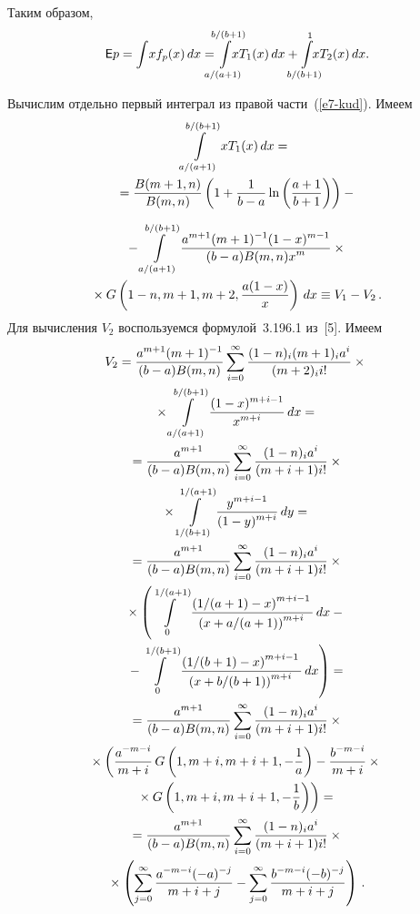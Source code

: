 \begin{multicols}{2}
Таким образом,
\begin{equation}
 {\sf E} p = \int\! xf_p(x)\,dx=\hspace*{-3mm}\il{a/(a+1)}{b/(b+1)}\hspace*{-4mm}
 xT_{1}(x)\, dx + \hspace*{-3mm}\il{b/(b+1)}{1} \hspace*{-4mm}xT_{2}(x)\, dx.\!\label{e7-kud}
 \end{equation}

Вычислим отдельно первый интеграл из правой части~(\ref{e7-kud}). Имеем
\begin{multline*}
\il{a/(a+1)}{b/(b+1)} xT_{1}(x) \,dx ={}\\
{}= \fr{B(m + 1, n)}{B(m,n)}
 \left( 1 + \fr{1}{b-a} \ln \left( \fr{a+1}{b+1}\right)  \right) -{}
\end{multline*}

\noindent
\begin{multline*}
{}- \il{a/(a+1)}{b/(b+1)}\fr{a^{m+1}(m+1)^{-1}(1-x)^{m-1}}{(b-a) B(m,n)x^{m}}  \times{}\\
{}\times
G\left(1-n,m+1, m+2, \fr{a(1 - x)}{x} \right)\,dx \equiv V_1-V_2\,.
\end{multline*}
Для вычисления $V_2$ воспользуемся формулой~3.196.1 из~[5]. Имеем
\begin{multline*}
V_2= \fr{a^{m+1}(m+1)^{-1}}{(b - a)B(m,n)} \sum\limits_{i=0}^{\infty}
\fr{(1-n)_{i}(m+1)_{i} a^{i}}{(m+2)_{i} i! }\times{}\\
{}\times
\il{a/(a+1)}{b/(b+1)} \fr{(1-x)^{m+i-1}}{x^{m+i}}\, dx  ={}\\
{}= \fr{a^{m+1}}{(b - a)B(m,n)} \sum\limits_{i=0}^{\infty}
\fr{(1-n)_{i}a^{i}}{(m+i+1)i! }\times{}\\
{}\times
\il{1/(b+1)}{1/(a+1)} \fr{y^{m+i-1}}{(1-y)^{m+i}}\, dy  ={}\\
{}= \fr{a^{m+1}}{(b - a)B(m,n)} \sum\limits_{i=0}^{\infty}
\fr{(1-n)_{i}a^{i}}{(m+i+1) i! }\times{}\\
{}\times
\left( \il{0}{1/(a+1)}
\fr{\left( 1/(a+1)-x\right)^{m+i-1}}
{\left(x+a/(a+1)\right)^{m+i}}\, dx -{}\right.\\
\left.{}-
\il{0}{1/(b+1)}
\fr{\left(1/(b+1)-x\right)^{m+i-1}}
{\left(x+b/(b+1)\right)^{m+i}}\, dx\right)  ={}\\
{}= \fr{a^{m+1}}{(b - a)B(m,n)} \sum\limits_{i=0}^{\infty}
\fr{(1-n)_{i}a^{i}}{(m+i+1) i! }\times{}\\
{}\times\left( \fr{a^{-m-i}}{m+i}\,G\left(1,m+i,m+i+1,-\fr{1}{a}\right)-
\fr{b^{-m-i}}{m+i}\times{}\right.\\
\left.{}\times G\left(1,m+i,m+i+1,-\fr{1}{b}\right)\right)={}\\
{}= \fr{a^{m+1}}{(b - a)B(m,n)} \sum\limits_{i=0}^{\infty}
\fr{(1-n)_{i}a^{i}}{(m+i+1) i! }\times{}\\
{}\times\left(
\sum\limits_{j=0}^\infty \fr{a^{-m-i}(-a)^{-j}}{m+i+j}-
\sum\limits_{j=0}^\infty \fr{b^{-m-i}(-b)^{-j}}{m+i+j}\right)\,.
\end{multline*}



\end{multicols}
